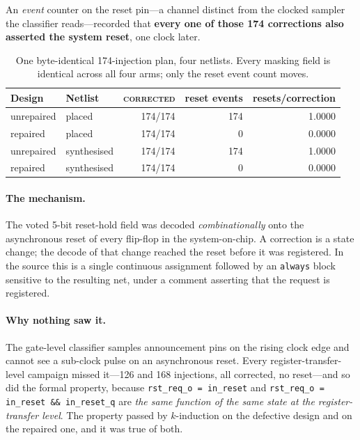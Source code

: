 \documentclass[11pt,a4paper]{article}
\begin{document}
An \emph{event} counter on the reset pin---a channel distinct from the
clocked sampler the classifier reads---recorded that \textbf{every one of
those 174 corrections also asserted the system reset}, one clock later.

\begin{table}[htbp]
\centering
\caption{One byte-identical 174-injection plan, four netlists.
Every masking field is identical across all four arms; only the reset
event count moves.}
\label{tab:w9}
\small
\begin{tabular}{llrrr}
\toprule
Design & Netlist & \textsc{corrected} & reset events & resets/correction \\
\midrule
unrepaired & placed      & 174/174 & 174 & 1.0000 \\
repaired   & placed      & 174/174 & 0   & 0.0000 \\
unrepaired & synthesised & 174/174 & 174 & 1.0000 \\
repaired   & synthesised & 174/174 & 0   & 0.0000 \\
\bottomrule
\end{tabular}
\end{table}

\paragraph{The mechanism.}
The voted 5-bit reset-hold field was decoded \emph{combinationally} onto
the asynchronous reset of every flip-flop in the system-on-chip. A
correction is a state change; the decode of that change reached the
reset before it was registered. In the source this is a single
continuous assignment followed by an \texttt{always} block sensitive to
the resulting net, under a comment asserting that the request is
registered.

\paragraph{Why nothing saw it.}
The gate-level classifier samples announcement pins on the rising clock
edge and cannot see a sub-clock pulse on an asynchronous reset. Every
register-transfer-level campaign missed it---126 and 168 injections, all
corrected, no reset---and so did the formal property, because
\texttt{rst\_req\_o = in\_reset} and
\texttt{rst\_req\_o = in\_reset \&\& in\_reset\_q} are \emph{the same
function of the same state at the register-transfer level}. The property
passed by $k$-induction on the defective design and on the repaired one,
and it was true of both.
\end{document}
